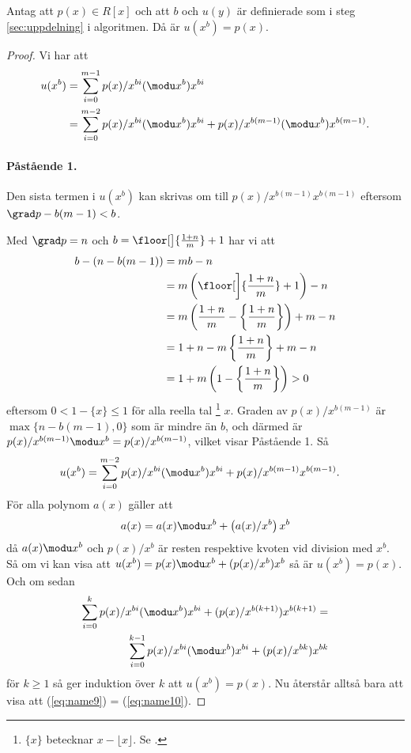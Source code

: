\begin{lemma}
  \label{lemma:2}
  Antag att $p(x) \in R[x]$ och att $b$ och $u(y)$ är definierade som i steg \ref{sec:uppdelning}
  i algoritmen. Då är $u(x^b)=p(x)$.
\end{lemma}
\begin{proof}
  Vi har att
  \begin{align*}
    u(x^b) &= \sum_{i = 0}^{m-1} p(x)/x^{bi} (\modu x^b) x^{bi} \\
           &= \sum_{i = 0}^{m-2} p(x)/x^{bi} (\modu x^b) x^{bi} + p(x)/x^{b(m-1)} (\modu x^b) x^{b (m-1)}.
  \end{align*}
  \paragraph{Påstående 1.} Den sista termen i $u(x^b)$ kan skrivas om till
  $p(x)/x^{b (m-1)} x^{b (m-1)}$ eftersom $\grad p - b (m-1) < b$.

  Med $\grad p = n$ och $b = \floor[\big]{\frac{1 + n}{m}} + 1$ har vi att
  \begin{align*}
    b - (n - b(m-1)) &= m b - n \\
                     &= m \left( \floor[\bigg]{\frac{1 + n}{m}} + 1 \right) - n \\
                     &= m \left( \frac{1 + n}{m} - \left\{ \frac{1 + n}{m} \right\} \right) + m - n \\
                     &= 1 + n - m \left\{ \frac{1 + n}{m} \right\} + m - n \\
                     &= 1 + m \left( 1 - \left\{ \frac{1 + n}{m} \right\} \right) > 0
  \end{align*}
  eftersom $0 < 1 - \{ x \} \leq 1$ för alla reella tal
  \footnote{$\{x\}$ betecknar $x-\lfloor x \rfloor$. Se \cite{graham1989concrete}.}
  $x$. Graden av $p(x)/x^{b(m-1)}$ är $\max \{n - b(m-1),0\}$ som är mindre än $b$,
  och därmed är $p(x)/x^{b(m-1)} \modu x^b = p(x)/x^{b(m-1)}$, vilket visar
  Påstående 1. Så
  \begin{align*}
    u(x^b) &= \sum_{i = 0}^{m-2} p(x)/x^{bi} (\modu x^b) x^{bi} + p(x)/x^{b(m-1)} x^{b(m-1)}.
  \end{align*}
  För alla polynom $a(x)$ gäller att
  \begin{align}
    a(x) = a(x) \modu x^b + \left(a(x)/x^b\right) x^b \label{eq:name8}
  \end{align}
  då $a(x) \modu x^b$ och $p(x)/x^{b}$ är resten respektive kvoten vid division
  med $x^b$. Så om vi kan visa att $u(x^b) = p(x) \modu x^b + (p(x)/x^{b}) x^{b}$
  så är $u(x^b) = p(x)$. Och om sedan
  \begin{align}
    \sum_{i = 0}^{k} p(x)/x^{bi} (\modu x^b) x^{bi} + (p(x)/x^{b(k + 1)}) x^{b(k + 1)} = \label{eq:name9} \\
    \sum_{i = 0}^{k-1} p(x)/x^{bi} (\modu x^b) x^{bi} + (p(x)/x^{b k}) x^{b k} \label{eq:name10}
  \end{align}
  för $k \geq 1$ så ger induktion över $k$ att $u(x^b) = p(x)$. Nu återstår
  alltså bara att visa att (\ref{eq:name9}) = (\ref{eq:name10}).


\end{proof}
